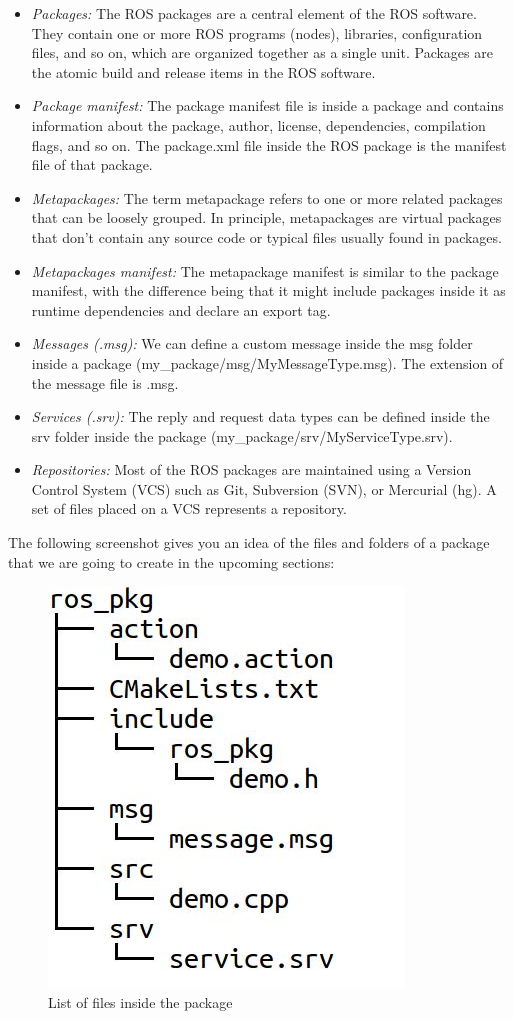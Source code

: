 \documentclass[../../main]{subfiles}
\begin{document}
\begin{itemize}
\item  \emph{Packages:} The ROS packages are a central element of the ROS software. They
    contain one or more ROS programs (nodes), libraries, configuration files, and so
    on, which are organized together as a single unit. Packages are the atomic build and
    release items in the ROS software.
\item  \emph{Package manifest:} The package manifest file is inside a package and contains
    information about the package, author, license, dependencies, compilation flags,
    and so on. The package.xml file inside the ROS package is the manifest file of
    that package.
\item  \emph{Metapackages:} The term metapackage refers to one or more related packages that
    can be loosely grouped. In principle, metapackages are virtual packages that don't
    contain any source code or typical files usually found in packages.
\item  \emph{Metapackages manifest:} The metapackage manifest is similar to the package
    manifest, with the difference being that it might include packages inside it as
    runtime dependencies and declare an export tag.
\item  \emph{Messages (.msg):} We can define a custom message inside the msg folder inside
    a package (my\_package/msg/MyMessageType.msg). The extension of the
    message file is .msg.
\item  \emph{Services (.srv):} The reply and request data types can be defined inside the srv
    folder inside the package (my\_package/srv/MyServiceType.srv).
\item  \emph{Repositories:} Most of the ROS packages are maintained using a Version Control
    System (VCS) such as Git, Subversion (SVN), or Mercurial (hg). A set of files
    placed on a VCS represents a repository.
\end{itemize}
The following screenshot gives you an idea of the files and folders of a package that we are
going to create in the upcoming sections:
\begin{figure}[ht]
    \centering
    \includegraphics{img/rosfile.jpg}
    \caption{List of files inside the package}
\end{figure}
\end{document}
